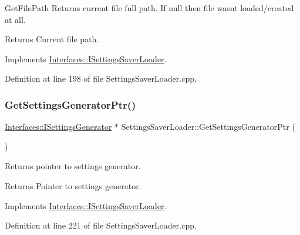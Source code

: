 Get\+File\+Path Returns current file full path. If null then file wasn\textquotesingle{}t loaded/created at all. 

\begin{DoxyReturn}{Returns}
Current file path. 
\end{DoxyReturn}


Implements \hyperlink{class_interfaces_1_1_i_settings_saver_loader_a7224c9ffc2d9c6a3b98fb20246e97cc3}{Interfaces\+::\+I\+Settings\+Saver\+Loader}.



Definition at line 198 of file Settings\+Saver\+Loader.\+cpp.

\mbox{\label{class_settings_saver_loader_aa6b0a9b4f42335b03341a13f8bfff845}} 
\subsubsection{\texorpdfstring{Get\+Settings\+Generator\+Ptr()}{GetSettingsGeneratorPtr()}}
{\footnotesize\ttfamily \hyperlink{class_interfaces_1_1_i_settings_generator}{Interfaces\+::\+I\+Settings\+Generator} $\ast$ Settings\+Saver\+Loader\+::\+Get\+Settings\+Generator\+Ptr (\begin{DoxyParamCaption}{ }\end{DoxyParamCaption})\hspace{0.3cm}{\ttfamily [virtual]}}



Returns pointer to settings generator. 

\begin{DoxyReturn}{Returns}
Pointer to settings generator. 
\end{DoxyReturn}


Implements \hyperlink{class_interfaces_1_1_i_settings_saver_loader_a73c8012dc63ca02d65a013ca901840ba}{Interfaces\+::\+I\+Settings\+Saver\+Loader}.



Definition at line 221 of file Settings\+Saver\+Loader.\+cpp.

\mbox{\label{class_settings_saver_loader_a35574bdfc340a148245ea8017c59f2eb}} 
